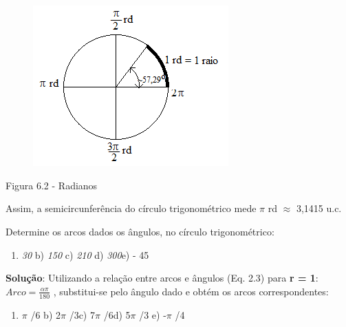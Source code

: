 \begin{figure}[H]
    \begin{Center}
        \includegraphics[width=2.96in,height=2.43in]{capitulos/trigonometria_e_funcoes_trigonometricas/media/image28.png}
    \end{Center}
\end{figure}

Figura 6.2 - Radianos

Assim, a semicircunferência do círculo trigonométrico mede $ \pi $  rd $ \approx $   3,1415 u.c.

\begin{texemplo}
Determine os arcos dados os ângulos, no círculo trigonométrico:

\begin{enumerate}
    \item \textit{30\degree} \tab \tab b) \textit{150\degree } \tab c) \textit{210\degree}     \tab  d) \textit{300\degree }\tab e) - 45\degree
\end{enumerate}

\textbf{Solução}: Utilizando a relação entre arcos e ângulos (Eq. 2.3) para \textbf{r = 1}:   \( Arco=\frac{ \alpha   \pi  }{180} \)  , substitui-se   pelo ângulo dado e obtém os arcos correspondentes:

\begin{enumerate}
    \item $ \pi $ /6 \tab \tab b) 2$ \pi $ /3\tab \tab c) 7$ \pi $ /6\tab     \tab  d) 5$ \pi $ /3 \tab e) -$ \pi $ /4 \qedsymbol\tab 
\end{enumerate}
\end{texemplo}

